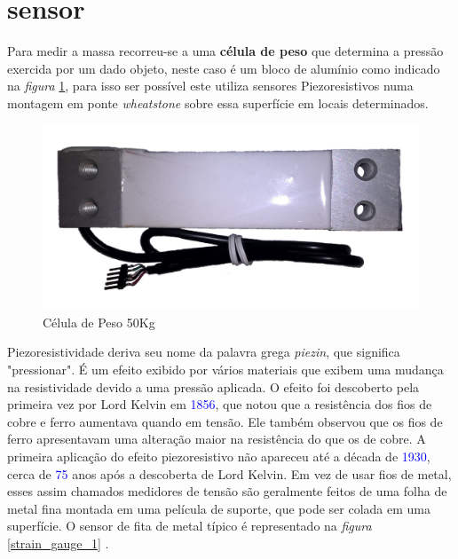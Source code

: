 \section{sensor}
Para medir a massa recorreu-se a uma \textbf{célula de peso} que determina a pressão exercida por um dado objeto, neste caso é um bloco de alumínio como indicado na \textit{figura} \ref{Load_Cell_1}, para isso ser possível este utiliza sensores Piezoresistivos numa montagem em ponte \textit{wheatstone} sobre essa superfície em locais determinados.
\\
\begin{figure}[H]
	\captionsetup{justification=raggedright,singlelinecheck=false}
	\flushleft
	\includegraphics[scale=0.15]{./image/PESTA/material/Load_Cell_1.jpg}
	\caption{Célula de Peso 50Kg}
	\label{Load_Cell_1}
\end{figure}
Piezoresistividade deriva seu nome da palavra grega \textit{piezin}, que significa "pressionar". É um efeito exibido por vários materiais que exibem uma mudança na resistividade devido a uma pressão aplicada. O efeito foi descoberto pela primeira vez por Lord Kelvin em \textcolor{blue}{1856}, que notou que a resistência dos fios de cobre e ferro aumentava quando em tensão. Ele também observou que os fios de ferro apresentavam uma alteração maior na resistência do que os de cobre. A primeira aplicação do efeito piezoresistivo não apareceu até a década de \textcolor{blue}{1930}, cerca de \textcolor{blue}{75} anos após a descoberta de Lord Kelvin. Em vez de usar fios de metal, esses assim chamados medidores de tensão são geralmente feitos de uma folha de metal fina montada em uma película de suporte, que pode ser colada em uma superfície. O sensor de fita de metal típico é representado na \textit{figura} \ref{strain_gauge_1} \cite{book-9}.
\\
\\
